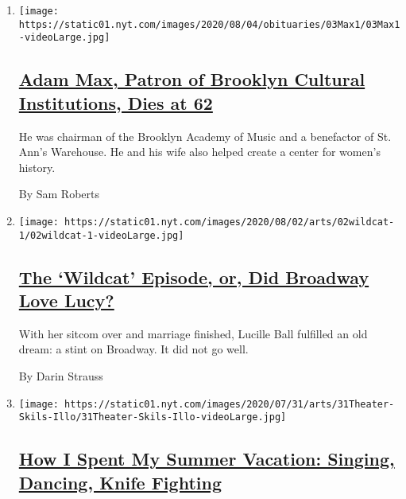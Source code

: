 \begin{enumerate}
\def\labelenumi{\arabic{enumi}.}
\item
  \texttt{[image: https://static01.nyt.com/images/2020/08/04/obituaries/03Max1/03Max1-videoLarge.jpg]}

  \hypertarget{adam-max-patron-of-brooklyn-cultural-institutions-dies-at-62}{%
  \subsection{\texorpdfstring{\href{/2020/08/03/arts/adam-max-patron-of-brooklyn-cultural-institutions-dies-at-62.html}{Adam
  Max, Patron of Brooklyn Cultural Institutions, Dies at
  62}}{Adam Max, Patron of Brooklyn Cultural Institutions, Dies at 62}}\label{adam-max-patron-of-brooklyn-cultural-institutions-dies-at-62}}

  He was chairman of the Brooklyn Academy of Music and a benefactor of
  St. Ann's Warehouse. He and his wife also helped create a center for
  women's history.

  By Sam Roberts
\item
  \texttt{[image: https://static01.nyt.com/images/2020/08/02/arts/02wildcat-1/02wildcat-1-videoLarge.jpg]}

  \hypertarget{the-wildcat-episode-or-did-broadway-love-lucy}{%
  \subsection{\texorpdfstring{\href{/2020/07/31/theater/lucille-ball-wildcat.html}{The
  `Wildcat' Episode, or, Did Broadway Love
  Lucy?}}{The `Wildcat' Episode, or, Did Broadway Love Lucy?}}\label{the-wildcat-episode-or-did-broadway-love-lucy}}

  With her sitcom over and marriage finished, Lucille Ball fulfilled an
  old dream: a stint on Broadway. It did not go well.

  By Darin Strauss
\item
  \texttt{[image: https://static01.nyt.com/images/2020/07/31/arts/31Theater-Skils-Illo/31Theater-Skils-Illo-videoLarge.jpg]}

  \hypertarget{how-i-spent-my-summer-vacation-singing-dancing-knife-fighting}{%
  \subsection{\texorpdfstring{\href{/2020/07/30/theater/theater-classes-at-home.html}{How
  I Spent My Summer Vacation: Singing, Dancing, Knife
  Fighting}}{How I Spent My Summer Vacation: Singing, Dancing, Knife Fighting}}\label{how-i-spent-my-summer-vacation-singing-dancing-knife-fighting}}


\end{enumerate}
